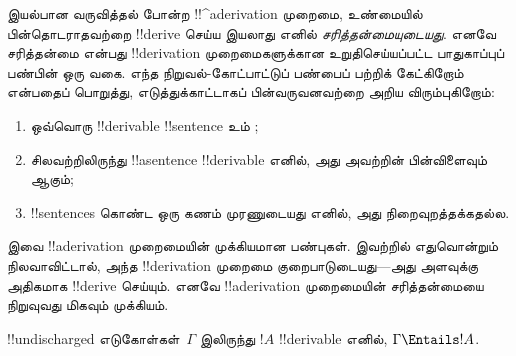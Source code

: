 \documentclass[../../../include/open-logic-section]{subfiles}
\begin{document}
      {}
      {}
      

\begin{explain}
இயல்பான வருவித்தல் போன்ற !!^a{derivation} முறைமை, உண்மையில் பின்தொடராதவற்றை
!!{derive} செய்ய இயலாது எனில் \emph{சரித்தன்மையுடையது}. எனவே சரித்தன்மை
என்பது !!{derivation} முறைமைகளுக்கான உறுதிசெய்யப்பட்ட பாதுகாப்புப் பண்பின்
ஒரு வகை. எந்த நிறுவல்-கோட்பாட்டுப் பண்பைப் பற்றிக் கேட்கிறோம் என்பதைப் பொறுத்து,
எடுத்துக்காட்டாகப் பின்வருவனவற்றை அறிய விரும்புகிறோம்:
\begin{enumerate}
\item ஒவ்வொரு !!{derivable} !!{sentence} உம் ;
\item சிலவற்றிலிருந்து !!a{sentence} !!{derivable} எனில், அது அவற்றின்
  பின்விளைவும் ஆகும்;
\item !!{sentence}s கொண்ட ஒரு கணம் முரணுடையது எனில், அது நிறைவுறத்தக்கதல்ல.
\end{enumerate}
இவை !!a{derivation} முறைமையின் முக்கியமான பண்புகள். இவற்றில் எதுவொன்றும்
நிலவாவிட்டால், அந்த !!{derivation} முறைமை குறைபாடுடையது—அது அளவுக்கு அதிகமாக
!!{derive} செய்யும். எனவே !!a{derivation} முறைமையின் சரித்தன்மையை நிறுவுவது
மிகவும் முக்கியம்.
\end{explain}

\begin{thm}[சரித்தன்மை]
!!{undischarged} எடுகோள்கள்~$\Gamma$ இலிருந்து $!A$ !!{derivable} எனில்,
$\Gamma \Entails !A$.
\end{thm}
\end{document}
